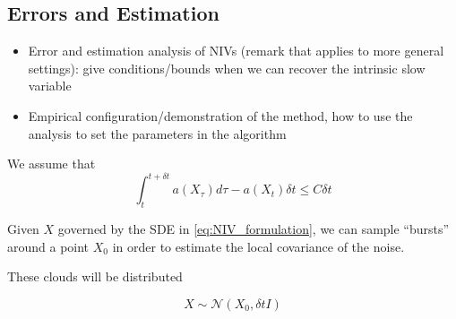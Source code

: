 \documentclass[1p]{elsarticle}
\begin{document}
\subsection{Errors and Estimation}

\begin{itemize}
\item Error and estimation analysis of NIVs (remark that applies to more general settings): give conditions/bounds when we can recover the intrinsic slow variable
%
\item Empirical configuration/demonstration of the method, how to use the analysis to set the parameters in the algorithm
\end{itemize}

We assume that
\begin{equation}
\int_{t}^{t + \delta t} a(X_\tau) d \tau - a(X_t) \delta t \le C \delta t
\end{equation}

Given $X$ governed by the SDE in \eqref{eq:NIV_formulation}, we can sample ``bursts'' around a point $X_0$ in order to estimate the local covariance of the noise. 

These clouds will be distributed 

\begin{equation}
X \sim \mathcal{N}\left( X_0, \delta t I \right)
\end{equation}
\end{document}
